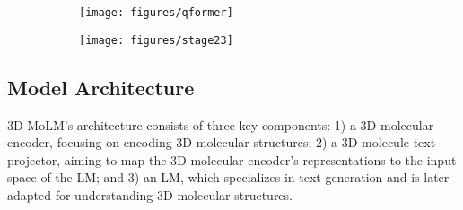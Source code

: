 \begin{figure}[t]
\centering
\small
\begin{subfigure}[b]{\textwidth}
\centering
\small
\texttt{[image: figures/qformer]}
\vspace{-4pt}
\caption{}
\label{fig:qformer}
\end{subfigure}
\vspace{1cm}
\begin{subfigure}[b]{\textwidth}
\centering
\small
\texttt{[image: figures/stage23]}
\caption{}
\vspace{-32pt}
\label{fig:stage23}
\end{subfigure}
\caption{}
\label{fig:qformer_and_stage23}
\vspace{-12pt}
\end{figure}

\vspace{-1mm}
\subsection{Model Architecture}
\vspace{-1mm}
3D-MoLM's architecture consists of three key components: 1) a 3D molecular encoder, focusing on encoding 3D molecular structures; 2) a 3D molecule-text projector, aiming to map the 3D molecular encoder's representations to the input space of the LM; and 3) an LM, which specializes in text generation and is later adapted for understanding 3D molecular structures.

